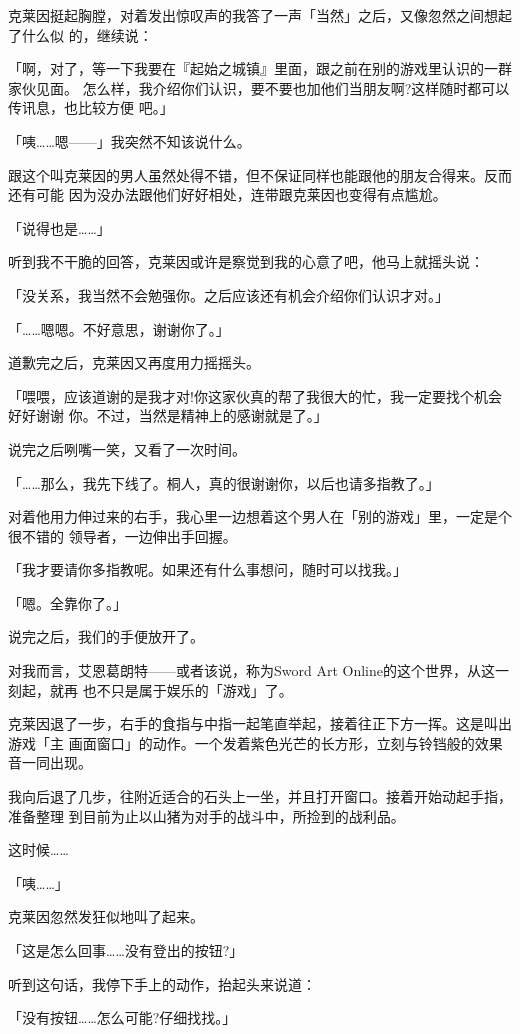 \documentclass[11pt]{book}
\begin{document}
克莱因挺起胸膛，对着发出惊叹声的我答了一声「当然」之后，又像忽然之间想起了什么似
的，继续说：

「啊，对了，等一下我要在『起始之城镇』里面，跟之前在别的游戏里认识的一群家伙见面。
怎么样，我介绍你们认识，要不要也加他们当朋友啊?这样随时都可以传讯息，也比较方便
吧。」

「咦……嗯——」我突然不知该说什么。

跟这个叫克莱因的男人虽然处得不错，但不保证同样也能跟他的朋友合得来。反而还有可能
因为没办法跟他们好好相处，连带跟克莱因也变得有点尴尬。

「说得也是……」

听到我不干脆的回答，克莱因或许是察觉到我的心意了吧，他马上就摇头说：

「没关系，我当然不会勉强你。之后应该还有机会介绍你们认识才对。」

「……嗯嗯。不好意思，谢谢你了。」

道歉完之后，克莱因又再度用力摇摇头。

「喂喂，应该道谢的是我才对!你这家伙真的帮了我很大的忙，我一定要找个机会好好谢谢
你。不过，当然是精神上的感谢就是了。」

说完之后咧嘴一笑，又看了一次时间。

「……那么，我先下线了。桐人，真的很谢谢你，以后也请多指教了。」

对着他用力伸过来的右手，我心里一边想着这个男人在「别的游戏」里，一定是个很不错的
领导者，一边伸出手回握。

「我才要请你多指教呢。如果还有什么事想问，随时可以找我。」

「嗯。全靠你了。」

说完之后，我们的手便放开了。

对我而言，艾恩葛朗特——或者该说，称为Sword Art Online的这个世界，从这一刻起，就再
也不只是属于娱乐的「游戏」了。

克莱因退了一步，右手的食指与中指一起笔直举起，接着往正下方一挥。这是叫出游戏「主
画面窗口」的动作。一个发着紫色光芒的长方形，立刻与铃铛般的效果音一同出现。

我向后退了几步，往附近适合的石头上一坐，并且打开窗口。接着开始动起手指，准备整理
到目前为止以山猪为对手的战斗中，所捡到的战利品。

这时候……

「咦……」

克莱因忽然发狂似地叫了起来。

「这是怎么回事……没有登出的按钮?」

听到这句话，我停下手上的动作，抬起头来说道：

「没有按钮……怎么可能?仔细找找。」
\end{document}
